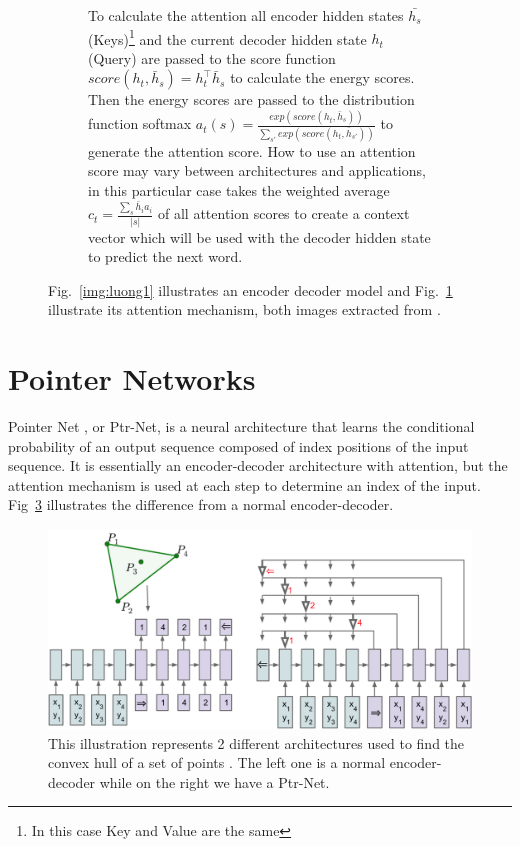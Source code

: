 \begin{figure}
\begin{subfigure}{.75\textwidth}
  \caption{To calculate the attention all encoder hidden states $\bar{h_s}$ (Keys)\footnote{In this case Key and Value are the same} and the current decoder hidden state $h_t$ (Query) are passed to the score function $score(h_t, \bar{h}_s) = h_t^\top \bar{h}_s$ to calculate the energy scores. Then the energy scores are passed to the distribution function softmax $a_t(s)= \frac{exp(score(h_t, \bar{h}_{s}))}{\sum_{{{s}}'} exp(score(h_t, \bar{h}_{{s}'}))}$ to generate the attention score.
    How to use an attention score may vary between architectures and applications, in this particular case \citet{luong2015effective} takes the weighted average $c_t =\frac{\sum_s \bar{h}_i a_i}{|s|}$ of all attention scores to create a context vector which will be used with the decoder hidden state to predict the next word.
}
  \label{img:luong2}
\end{subfigure}
\caption{Fig.~\ref{img:luong1} illustrates an encoder decoder model and Fig.~\ref{img:luong2} illustrate its attention mechanism, both images extracted from \citet{luong2015effective}.}
  \label{img:luong}

\end{figure}






\section{Pointer Networks}
\label{sec:ptrnet}
Pointer Net \citep{pointer}, or Ptr-Net, is a neural architecture that learns the conditional probability of an output sequence composed of index positions of the input sequence. It is essentially an encoder-decoder architecture with attention, but the attention mechanism is used at each step to determine an index of the input. Fig~\ref{ptr_hull} illustrates the difference from a normal encoder-decoder.


\begin{figure}[!ht]
\centering
\includegraphics[scale=1.2]{figuras/ptrjunto.png}
\caption{This illustration represents 2 different architectures used to find the convex hull of a set of points \citep{pointer}. The left one is a normal encoder-decoder while on the right we have a Ptr-Net. } 
\label{ptr_hull}
\end{figure}

